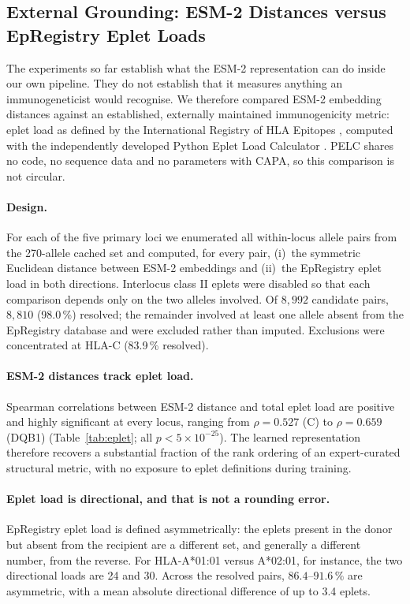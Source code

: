 \documentclass[11pt,a4paper]{article}
\begin{document}
\subsection{External Grounding: ESM-2 Distances versus EpRegistry Eplet Loads}
\label{sec:eplet}

The experiments so far establish what the ESM-2 representation can do inside
our own pipeline.  They do not establish that it measures anything an
immunogeneticist would recognise.  We therefore compared ESM-2 embedding
distances against an established, externally maintained immunogenicity
metric: eplet load as defined by the International Registry of HLA Epitopes
\citep{duquesnoy2014epregistry}, computed with the independently developed
Python Eplet Load Calculator \citep{lhotte2022pelc}.  PELC shares no code,
no sequence data and no parameters with CAPA, so this comparison is not
circular.

\paragraph{Design.}
For each of the five primary loci we enumerated all within-locus allele pairs
from the 270-allele cached set and computed, for every pair, (i)~the symmetric
Euclidean distance between ESM-2 embeddings and (ii)~the EpRegistry eplet
load in both directions.  Interlocus class II eplets were disabled so that
each comparison depends only on the two alleles involved.  Of $8{,}992$
candidate pairs, $8{,}810$ (98.0\,\%) resolved; the remainder involved at
least one allele absent from the EpRegistry database and were excluded rather
than imputed.  Exclusions were concentrated at HLA-C (83.9\,\% resolved).

\paragraph{ESM-2 distances track eplet load.}
Spearman correlations between ESM-2 distance and total eplet load are positive
and highly significant at every locus, ranging from $\rho = 0.527$ (C) to
$\rho = 0.659$ (DQB1) (Table~\ref{tab:eplet}; all $p < 5\times10^{-25}$).
The learned representation therefore recovers a substantial fraction of the
rank ordering of an expert-curated structural metric, with no exposure to
eplet definitions during training.

\paragraph{Eplet load is directional, and that is not a rounding error.}
EpRegistry eplet load is defined asymmetrically: the eplets present in the
donor but absent from the recipient are a different set, and generally a
different number, from the reverse.  For HLA-A*01:01 versus A*02:01, for
instance, the two directional loads are 24 and 30.  Across the resolved pairs,
$86.4$--$91.6\,\%$ are asymmetric, with a mean absolute directional difference
of up to 3.4 eplets.
\end{document}
